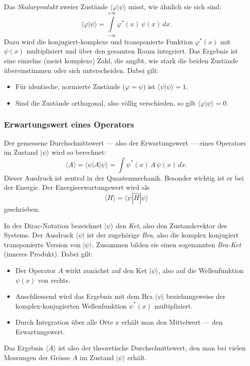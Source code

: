 		Das \emph{Skalarprodukt} zweier Zustände $\langle \varphi | \psi \rangle$ misst, wie ähnlich sie sich sind:
		\begin{equation}
		\langle \varphi | \psi \rangle = \int\limits_{-\infty}^{+\infty} \varphi^*(x)\,\psi(x)\,dx.
		\end{equation}
		Dazu wird die konjugiert-komplexe und transponierte Funktion $\varphi^*(x)$ mit $\psi(x)$ multipliziert und über den gesamten Raum integriert.
		Das Ergebnis ist eine einzelne (meist komplexe) Zahl, die angibt, wie stark die beiden Zustände übereinstimmen oder sich unterscheiden. 
		Dabei gilt:
		\begin{itemize}
			\item Für identische, normierte Zustände ($\varphi = \psi$) ist $\langle \psi | \psi \rangle = 1$.
			\item Sind die Zustände orthogonal, also völlig verschieden, so gilt $\langle \varphi | \psi \rangle  = 0$.
		\end{itemize}
	
	\subsubsection{Erwartungswert eines Operators\label{fourier:subsubsection:erwartungswertEinesOperators}}
		Der gemessene Durchschnittswert --- also der Erwartungswert --- eines Operators im Zustand $|\psi\rangle$ wird so berechnet:
		\begin{equation}
			\langle A \rangle = \langle \psi | A | \psi \rangle = \int \psi^*(x)\,A\,\psi(x)\,dx.
		\end{equation}
		Dieser Ausdruck ist zentral in der Quantenmechanik.
		Besonder wichtig ist er bei der Energie. Der Energieerwartungswert wird als
		\begin{equation}
			\langle H \rangle = \langle \psi|\hat{H}|\psi \rangle
		\end{equation}
		geschrieben.

		In der Dirac-Notation bezeichnet $|\psi\rangle$ den \emph{Ket}, also den Zustandsvektor des Systems.
		Der Ausdruck $\langle \psi |$ ist der zugehörige \emph{Bra}, also die komplex konjugiert transponierte Version von $|\psi\rangle$.
		Zusammen bilden sie einen sogenannten \emph{Bra-Ket} (inneres Produkt).
		Dabei gilt:
		\begin{itemize}
			\item Der Operator $A$ wirkt zunächst auf den Ket $|\psi\rangle$, also auf die Wellenfunktion $\psi(x)$ von rechts.
			\item Anschliessend wird das Ergebnis mit dem Bra $\langle \psi|$ beziehungsweise der komplex-konjugierten Wellenfunktion $\psi^*(x)$ multipliziert.
			\item Durch Integration über alle Orte $x$ erhält man den Mittelwert --- den Erwartungswert.
		\end{itemize}
		Das Ergebnis $\langle A \rangle$ ist also der theoretische Durchschnittswert, den man bei vielen Messungen der Grösse $A$ im Zustand $|\psi\rangle$ erhält.

